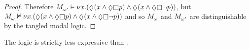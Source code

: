 \begin{proof}
Therefore $\kPModel{\omega'} \entails \gfp{\varX} (\possible (\varX \land \possible \necessary \atomP) \land \possible (\varX \land \possible \necessary \neg \atomP))$, 
but $\kPModel{\omega} \nentails \gfp{\varX} (\possible (\varX \land \possible \necessary \atomP) \land \possible (\varX \land \possible \necessary \neg \atomP))$
and so $\kPModel{\omega}$ and $\kPModel{\omega'}$ are distinguishable by the tangled modal logic.

\end{proof}

\begin{corollary}
The logic \logicRmlKF{} is strictly less expressive than \logicMuKF{}.
\end{corollary}
